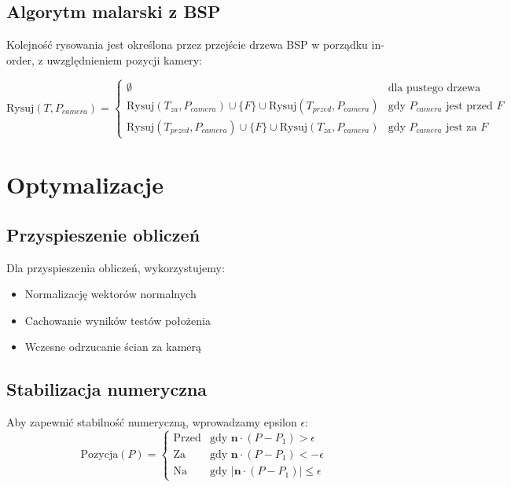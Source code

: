 \documentclass[a4paper,12pt]{article}
\begin{document}
\subsection{Algorytm malarski z BSP}

Kolejność rysowania jest określona przez przejście drzewa BSP w porządku in-order, z uwzględnieniem pozycji kamery:

\[
\text{Rysuj}(T, P_{camera}) = \begin{cases}
\emptyset & \text{dla pustego drzewa} \\
\text{Rysuj}(T_{za}, P_{camera}) \cup \{F\} \cup \text{Rysuj}(T_{przed}, P_{camera}) & \text{gdy } P_{camera} \text{ jest przed } F \\
\text{Rysuj}(T_{przed}, P_{camera}) \cup \{F\} \cup \text{Rysuj}(T_{za}, P_{camera}) & \text{gdy } P_{camera} \text{ jest za } F
\end{cases}
\]

\section{Optymalizacje}

\subsection{Przyspieszenie obliczeń}

Dla przyspieszenia obliczeń, wykorzystujemy:
\begin{itemize}
    \item Normalizację wektorów normalnych
    \item Cachowanie wyników testów położenia
    \item Wczesne odrzucanie ścian za kamerą
\end{itemize}

\subsection{Stabilizacja numeryczna}

Aby zapewnić stabilność numeryczną, wprowadzamy epsilon \(\epsilon\):
\[
\text{Pozycja}(P) = \begin{cases}
\text{Przed} & \text{gdy } \mathbf{n} \cdot (P - P_1) > \epsilon \\
\text{Za} & \text{gdy } \mathbf{n} \cdot (P - P_1) < -\epsilon \\
\text{Na} & \text{gdy } |\mathbf{n} \cdot (P - P_1)| \leq \epsilon
\end{cases}
\]
\end{document}
